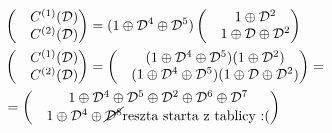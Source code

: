 \documentclass[12pt]{article}
\begin{document}
\begin{align*}
    & \begin{pmatrix}
        & C^{(1)}(\mathcal{D}) \\
        & C^{(2)}(\mathcal{D})
    \end{pmatrix} = (1\oplus \mathcal{D}^4 \oplus \mathcal{D}^5) 
    \begin{pmatrix}
        & 1 \oplus \mathcal{D}^2 \\
        & 1 \oplus \mathcal{D} \oplus \mathcal{D}^2 \\
    \end{pmatrix}  \\
    & \begin{pmatrix}
        & C^{(1)}(\mathcal{D}) \\
        & C^{(2)}(\mathcal{D})
    \end{pmatrix} =
    \begin{pmatrix}
        & (1 \oplus \mathcal{D}^4 \oplus \mathcal{D}^5 )(1\oplus\mathcal{D}^2) \\
        & (1 \oplus \mathcal{D}^4 \oplus \mathcal{D}^5 )(1 \oplus \mathcal{D}\oplus\mathcal{D}^2) 
    \end{pmatrix} =  \\
    & = \begin{pmatrix}
        & 1 \oplus \mathcal{D}^4 \oplus \mathcal{D}^5 \oplus \mathcal{D}^2 \oplus \mathcal{D}^6 \oplus \mathcal{D}^7 \\
        & 1 \oplus \mathcal{D}^4 \oplus \cancel{\mathcal{D}^8} \text{reszta starta z tablicy :(} 
    \end{pmatrix} \\
\end{align*}
\end{document}
